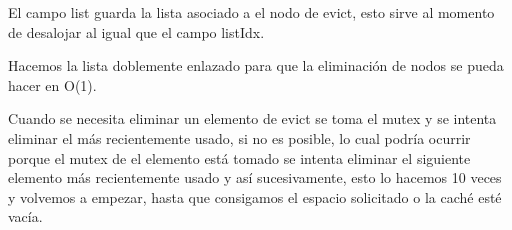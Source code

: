 \documentclass{article}
\begin{document}
El campo list guarda la lista asociado a el nodo de
evict, esto sirve al momento de desalojar al igual
que el campo listIdx.

Hacemos la lista doblemente enlazado para que la
eliminación de nodos se pueda hacer en O(1).

Cuando se necesita eliminar un elemento de evict
se toma el mutex y se intenta eliminar el más recientemente
usado, si no es posible, lo cual podría ocurrir porque
el mutex de el elemento está tomado se intenta eliminar el siguiente elemento más recientemente usado y así sucesivamente,
esto lo hacemos 10 veces y volvemos a empezar, hasta que
consigamos el espacio solicitado o la caché esté vacía.
\end{document}
